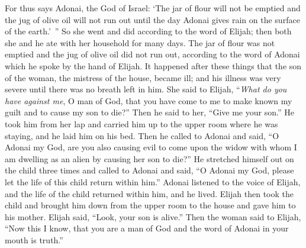 \begin{biblechapter}
\verse For thus says Adonai, the God of Israel: ‘The jar of flour will not be emptied and the jug of olive oil will not run out until the day Adonai gives rain on the surface of the earth.’ ”
\verse So she went and did according to the word of Elijah; then both she and he ate with her household for many days.
\verse The jar of flour was not emptied and the jug of olive oil did not run out, according to the word of Adonai which he spoke by the hand of Elijah.
\verse It happened after these things that the son of the woman, the mistress of the house, became ill; and his illness was very severe until there was no breath left in him.
\verse She said to Elijah, “\textit{What do you have against me}, O man of God, that you have come to me to make known my guilt and to cause my son to die?”
\verse Then he said to her, “Give me your son.” He took him from her lap and carried him up to the upper room where he was staying, and he laid him on his bed.
\verse Then he called to Adonai and said, “O Adonai my God, are you also causing evil to come upon the widow with whom I am dwelling as an alien by causing her son to die?”
\verse He stretched himself out on the child three times and called to Adonai and said, “O Adonai my God, please let the life of this child return within him.”
\verse Adonai listened to the voice of Elijah, and the life of the child returned within him, and he lived.
\verse Elijah then took the child and brought him down from the upper room to the house and gave him to his mother. Elijah said, “Look, your son is alive.”
\verse Then the woman said to Elijah, “Now this I know, that you are a man of God and the word of Adonai in your mouth is truth.”
\end{biblechapter}

